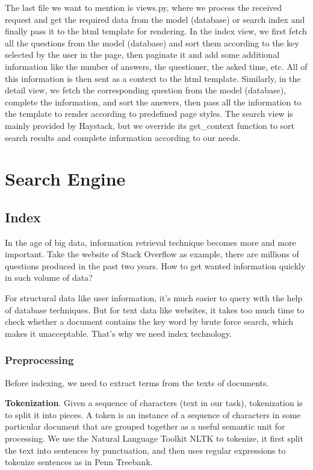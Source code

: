 \documentclass[10pt,journal,compsoc]{IEEEtran}
\begin{document}
The last file we want to mention is views.py, where we process the received request and get the required data from the model (database) or search index and finally pass it to the html template for rendering. In the index view, we first fetch all the questions from the model (database) and sort them according to the key selected by the user in the page, then paginate it and add some additional information like the number of answers, the questioner, the asked time, etc. All of this information is then sent as a context to the html template. Similarly, in the detail view, we fetch the corresponding question from the model (database), complete the information, and sort the answers, then pass all the information to the template to render according to predefined page styles. The search view is mainly provided by Haystack, but we override its get\_context function to sort search results and complete information according to our needs.


\section{Search Engine}
\label{sec:search_engine}

\subsection{Index}
\label{subsec:index}
In the age of big data, information retrieval technique becomes more and more important. Take the website of Stack Overflow as example, there are millions of questions produced in the past two years. How to get wanted information quickly in such volume of data? 

For structural data like user information, it's much easier to query with the help of database techniques. But for text data like websites, it takes too much time to check whether a document contains the key word by brute force search, which makes it unacceptable. That's why we need index technology.

\subsubsection{Preprocessing}
Before indexing, we need to extract terms from the texts of documents. 

\textbf{Tokenization}. Given a sequence of characters (text in our task), tokenization is to split it into pieces.  A token is an instance of a sequence of characters in some particular document that are grouped together as a useful semantic unit for processing. We use the Natural Language Toolkit NLTK to tokenize, it first split the text into sentences by punctuation, and then uses regular expressions to tokenize sentences as in Penn Treebank. 
\end{document}
